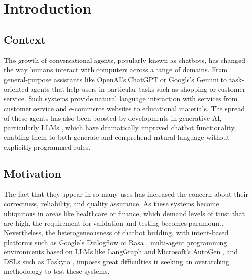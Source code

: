 
\chapter{Introduction}\label{chapter:introduction}

\section{Context}

The growth of conversational agents, popularly known as chatbots,
has changed the way humans interact with computers across a range of domains.
From general-purpose assistants like OpenAI's ChatGPT \autocite{ChatGPT} or Google's Gemini \autocite{GoogleGemini} to task-oriented agents that help users in particular tasks such as shopping or customer service.
Such systems provide natural language interaction with services from customer service and e-commerce websites to educational materials.
The spread of these agents has also been boosted by developments in generative \ac{AI}, particularly \acp{LLM} \autocite{minaeeLargeLanguageModels2025}, which have dramatically improved chatbot functionality, enabling them to both generate and comprehend natural language without explicitly programmed rules.

\section{Motivation}

The fact that they appear in so many uses has increased the concern about their correctness, reliability, and quality assurance.
As these systems become ubiquitous in areas like healthcare or finance, which demand levels of trust that are high, the requirement for validation and testing becomes paramount.
Nevertheless, the heterogeneousness of chatbot building, with intent-based platforms such as Google's Dialogflow \autocite{Dialogflow} or Rasa \autocite{Rasa2020}, multi-agent programming environments based on \acp{LLM} like LangGraph \autocite{LangGraph} and Microsoft's AutoGen \autocite{AutoGen}, and \acp{DSL} such as Taskyto \autocite{sanchezcuadradoAutomatingDevelopmentTaskoriented2024}, imposes great difficulties in seeking an overarching methodology to test these systems.


